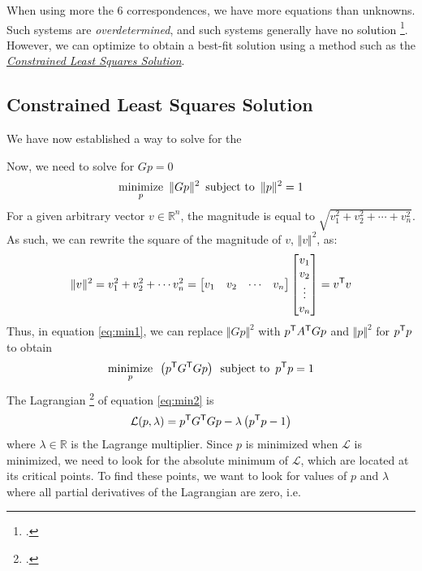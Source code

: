 When using more the 6 correspondences, we have more equations than unknowns. Such systems are \emph{overdetermined}, and such systems generally have no solution \footcite{williamsOverdeterminedSystems1990}. However, we can optimize to obtain a best-fit solution using a method such as the \hyperref[sec:clss]{\emph{Constrained Least Squares Solution}}. 

\subsection{Constrained Least Squares Solution} \label{sec:clss}

We have now established a way to solve for the

Now, we need to solve for $Gp = 0$
\begin{equation} \label{eq:min1}
    \underset{p}{\text{minimize}}\enspace \lVert Gp \rVert^2 \enspace \text{subject to} \enspace \lVert p \rVert^2 = 1
\end{equation}
For a given arbitrary vector $v \in \mathbb{R}^n$, the magnitude is equal to $\sqrt{v_1^2+v_2^2+ \cdots + v_n^2}$. As such, we can rewrite the square of the magnitude of $v$, $\Vert v \Vert ^2$, as:
\begin{equation*}
    \Vert v \Vert^2
    = v_1^2+v_2^2+ \cdots v_n^2
    =
    \begin{bmatrix}
        v_1 & v_2 & \cdots & v_n
    \end{bmatrix}
    \begin{bmatrix}
        v_1 \\ v_2 \\ \vdots \\ v_n
    \end{bmatrix}
    = v^{\mathsf{T}} v
\end{equation*}
Thus, in equation \ref{eq:min1}, we can replace $\Vert Gp \Vert^2$ with $p^{\mathsf{T}} A^{\mathsf{T}} Gp$ and $\Vert p \Vert ^2$ for $p^{\mathsf{T}} p$ to obtain
\begin{equation} \label{eq:min2}
    \underset{p}{\text{minimize}}\enspace \left(p^{\mathsf{T}} G^{\mathsf{T}} Gp\right) \enspace \text{subject to} \enspace p^{\mathsf{T}} p = 1
\end{equation}
The Lagrangian \footcite[][2]{ghojoghEigenvalueGeneralized2023} of equation \ref{eq:min2} is
\begin{equation}
    \mathcal{L}(p, \lambda) = p^{\mathsf{T}} G^{\mathsf{T}} Gp - \lambda \left( p^{\mathsf{T}} p - 1 \right)
\end{equation}
where $\lambda \in \mathbb{R}$ is the Lagrange multiplier. Since $p$ is minimized when $\mathcal{L}$ is minimized, we need to look for the absolute minimum of $\mathcal{L}$, which are located at its critical points. To find these points, we want to look for values of $p$ and $\lambda$ where all partial derivatives of the Lagrangian are zero, i.e.
